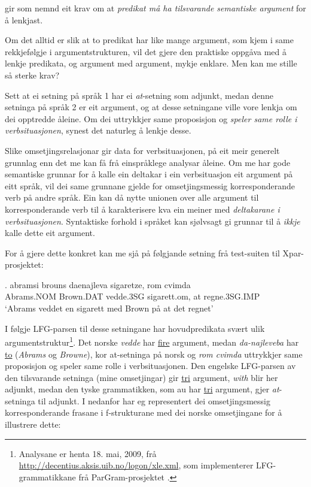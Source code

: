\documentclass[12pt,a4paper,oneside,draft]{report}
\begin{document}
\citet{thunes2003eal} gir som nemnd eit krav om at \emph{predikat må ha tilsvarande semantiske argument} for å lenkjast.

Om det alltid er slik at to predikat har like mange argument, som kjem i
same rekkjefølgje i argumentstrukturen, vil det gjere den praktiske
oppgåva med å lenkje predikata, og argument med argument, mykje
enklare. Men kan me stille så sterke krav?

Sett at ei setning på språk 1 har ei \emph{at}-setning som adjunkt, medan
denne setninga på språk 2 er eit argument, og at desse setningane
ville vore lenkja om dei opptredde åleine. Om dei uttrykkjer same
proposisjon og \emph{speler same rolle i verbsituasjonen}, synest det
naturleg å lenkje desse.

Slike omsetjingsrelasjonar gir data for verbsituasjonen, på eit meir
generelt grunnlag enn det me kan få frå einspråklege analysar
åleine. Om me har gode semantiske grunnar for å kalle ein deltakar i
ein verbsituasjon eit argument på eitt språk, vil dei same grunnane
gjelde for omsetjingsmessig korresponderande verb på andre språk. Ein
kan då nytte unionen over alle argument til korresponderande verb til
å karakterisere kva ein meiner med \emph{deltakarane i verbsituasjonen}. Syntaktiske forhold i språket kan sjølvsagt gi
grunnar til å \emph{ikkje} kalle dette eit argument.

For å gjere dette konkret kan me sjå på følgjande setning frå
test-suiten til Xpar-prosjektet:

\exg. abramsi brouns       daenajleva sigaretze, rom cvimda \label{ex:vedde-gloss} \\
      Abrams.NOM Brown.DAT vedde.3SG sigarett.om, at  regne.3SG.IMP \\
     `Abrams veddet en sigarett med Brown på at det regnet' 

I følgje LFG-parsen til desse setningane har hovudpredikata svært ulik
argumentstruktur\footnote{Analysane er henta 18. mai, 2009, frå
        \href{http://decentius.aksis.uib.no/logon/xle.xml}{http://decentius.aksis.uib.no/logon/xle.xml}, som implementerer
        LFG-grammatikkane frå ParGram-prosjektet \citep{butt2002pgp}. }. Det norske \emph{vedde} har \underline{fire} argument, medan
\emph{da-najleveba} har \underline{to} (\emph{Abrams} og \emph{Browne}), kor at-setninga på
norsk og \emph{rom cvimda} uttrykkjer same proposisjon og speler same rolle
i verbsituasjonen. Den engelske LFG-parsen av den tilsvarande setninga
(mine omsetjingar) gir \underline{tri} argument, \emph{with} blir her adjunkt, medan
den tyske grammatikken, som au har \underline{tri} argument, gjer \emph{at}-setninga
til adjunkt. I \Next nedanfor har eg representert dei omsetjingsmessig
korresponderande frasane i f-strukturane med dei norske omsetjingane
for å illustrere dette:
\end{document}
